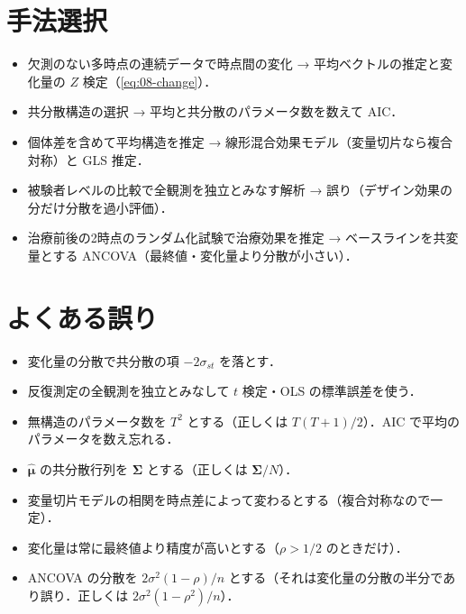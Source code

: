 \documentclass[a4paper,11pt,openany]{ltjsbook}
\begin{document}
\section{手法選択}\label{sec:08-choice}
\begin{itemize}
\item 欠測のない多時点の連続データで時点間の変化 → 平均ベクトルの推定と変化量の $Z$ 検定（\cref{eq:08-change}）．
\item 共分散構造の選択 → 平均と共分散のパラメータ数を数えて AIC．
\item 個体差を含めて平均構造を推定 → 線形混合効果モデル（変量切片なら複合対称）と GLS 推定．
\item 被験者レベルの比較で全観測を独立とみなす解析 → 誤り（デザイン効果の分だけ分散を過小評価）．
\item 治療前後の2時点のランダム化試験で治療効果を推定 → ベースラインを共変量とする ANCOVA（最終値・変化量より分散が小さい）．
\end{itemize}

\section{よくある誤り}\label{sec:08-err}
\begin{warnbox}
\begin{itemize}
\item 変化量の分散で共分散の項 $-2\sigma_{st}$ を落とす．
\item 反復測定の全観測を独立とみなして $t$ 検定・OLS の標準誤差を使う．
\item 無構造のパラメータ数を $T^2$ とする（正しくは $T(T+1)/2$）．AIC で平均のパラメータを数え忘れる．
\item $\hat{\bm\mu}$ の共分散行列を $\bm\Sigma$ とする（正しくは $\bm\Sigma/N$）．
\item 変量切片モデルの相関を時点差によって変わるとする（複合対称なので一定）．
\item 変化量は常に最終値より精度が高いとする（$\rho>1/2$ のときだけ）．
\item ANCOVA の分散を $2\sigma^2(1-\rho)/n$ とする（それは変化量の分散の半分であり誤り．正しくは $2\sigma^2(1-\rho^2)/n$）．
\end{itemize}
\end{warnbox}
\end{document}
